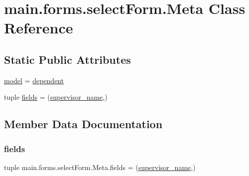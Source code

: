 \hypertarget{classmain_1_1forms_1_1selectForm_1_1Meta}{}\section{main.\+forms.\+select\+Form.\+Meta Class Reference}
\label{classmain_1_1forms_1_1selectForm_1_1Meta}
\subsection*{Static Public Attributes}
\begin{DoxyCompactItemize}
\item 
\hyperlink{classmain_1_1forms_1_1selectForm_1_1Meta_aef0b73f1a866bb91ab0e0b27b57c1ba3}{model} = \hyperlink{classmain_1_1models_1_1dependent}{dependent}
\item 
tuple \hyperlink{classmain_1_1forms_1_1selectForm_1_1Meta_a1fd2a14ccefc8e1b6865e35d4291f840}{fields} = (\textquotesingle{}\hyperlink{classmain_1_1forms_1_1selectForm_a950eb6c547591243d949a9754c6a3ead}{supervisor\+\_\+name}\textquotesingle{},)
\end{DoxyCompactItemize}


\subsection{Member Data Documentation}
\mbox{\label{classmain_1_1forms_1_1selectForm_1_1Meta_a1fd2a14ccefc8e1b6865e35d4291f840}} 
\subsubsection{\texorpdfstring{fields}{fields}}
{\footnotesize\ttfamily tuple main.\+forms.\+select\+Form.\+Meta.\+fields = (\textquotesingle{}\hyperlink{classmain_1_1forms_1_1selectForm_a950eb6c547591243d949a9754c6a3ead}{supervisor\+\_\+name}\textquotesingle{},)\hspace{0.3cm}{\ttfamily [static]}}

\mbox{\label{classmain_1_1forms_1_1selectForm_1_1Meta_aef0b73f1a866bb91ab0e0b27b57c1ba3}} 
